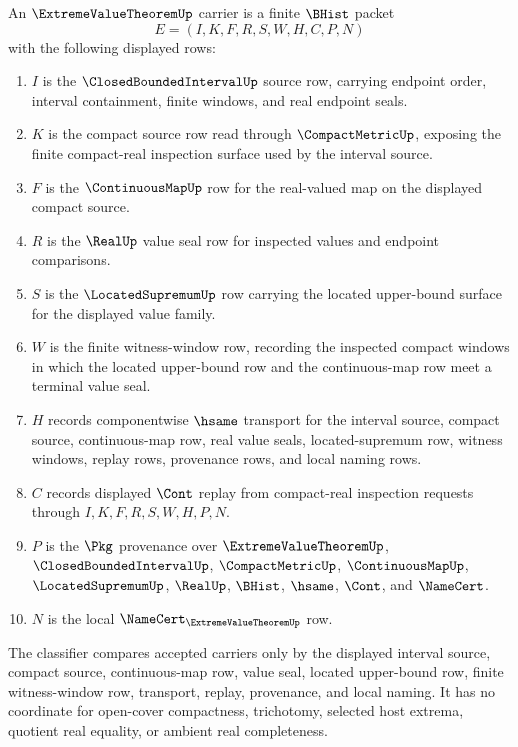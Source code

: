 \begin{definition}
\label{def:extreme-value-theorem-carrier}
An $\ExtremeValueTheoremUp$ carrier is a finite $\BHist$ packet
$$
E=(I,K,F,R,S,W,H,C,P,N)
$$
with the following displayed rows:
\begin{enumerate}
\item $I$ is the $\ClosedBoundedIntervalUp$ source row, carrying endpoint order, interval containment, finite windows, and real endpoint seals.
\item $K$ is the compact source row read through $\CompactMetricUp$, exposing the finite compact-real inspection surface used by the interval source.
\item $F$ is the $\ContinuousMapUp$ row for the real-valued map on the displayed compact source.
\item $R$ is the $\RealUp$ value seal row for inspected values and endpoint comparisons.
\item $S$ is the $\LocatedSupremumUp$ row carrying the located upper-bound surface for the displayed value family.
\item $W$ is the finite witness-window row, recording the inspected compact windows in which the located upper-bound row and the continuous-map row meet a terminal value seal.
\item $H$ records componentwise $\hsame$ transport for the interval source, compact source, continuous-map row, real value seals, located-supremum row, witness windows, replay rows, provenance rows, and local naming rows.
\item $C$ records displayed $\Cont$ replay from compact-real inspection requests through $I,K,F,R,S,W,H,P,N$.
\item $P$ is the $\Pkg$ provenance over $\ExtremeValueTheoremUp$, $\ClosedBoundedIntervalUp$, $\CompactMetricUp$, $\ContinuousMapUp$, $\LocatedSupremumUp$, $\RealUp$, $\BHist$, $\hsame$, $\Cont$, and $\NameCert$.
\item $N$ is the local $\NameCert_{\ExtremeValueTheoremUp}$ row.
\end{enumerate}
The classifier compares accepted carriers only by the displayed interval source, compact source, continuous-map row, value seal, located upper-bound row, finite witness-window row, transport, replay, provenance, and local naming. It has no coordinate for open-cover compactness, trichotomy, selected host extrema, quotient real equality, or ambient real completeness.
\end{definition}

